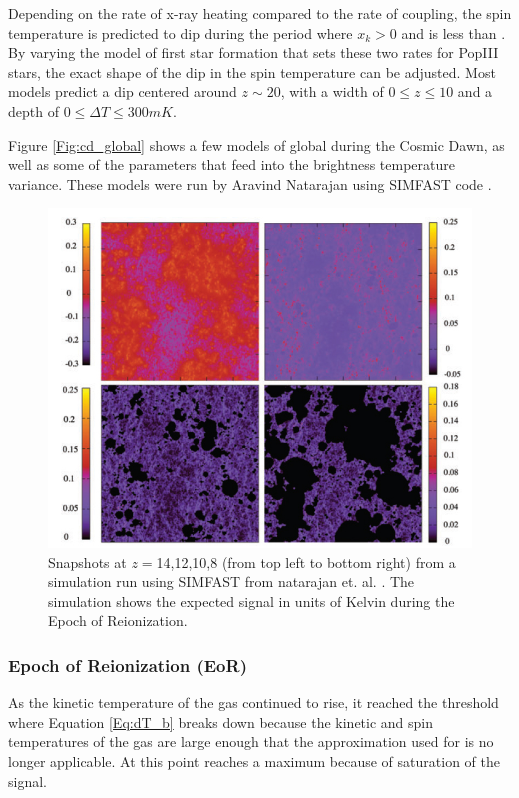 Depending on the rate of x-ray heating compared to the rate of \lya coupling, the spin temperature is predicted to dip during the period where $x_k>0$ and \tk is less than \tg. By varying the model of first star formation that sets these two rates for PopIII stars, the exact shape of the dip in the spin temperature can be adjusted. Most models predict a dip centered around $z\sim20$, with a width of $0 \leq z \leq 10$ and a depth of $0\leq \Delta T \leq 300 mK$. 

Figure \ref{Fig:cd_global} shows a few models of global \dtb during the Cosmic Dawn, as well as some of the parameters that feed into the brightness temperature variance. These models were run by Aravind Natarajan using SIMFAST code \cite{simfast}\cite{21cmfast}\cite{natarajan_2014}.  

\begin{figure}[htb]
\begin{center}
\includegraphics[width=0.95\linewidth]{Introduction/figures/reionization.jpg}
\caption{Snapshots at $z=$14,12,10,8 (from top left to bottom right) from a simulation run using SIMFAST from natarajan et. al. \cite{natarajan_2014}. The simulation shows the expected \dtb signal in units of Kelvin during the Epoch of Reionization. }
\label{Fig:eor}
\end{center}
\end{figure}

\subsubsection{Epoch of Reionization (EoR)}
As the kinetic temperature of the gas continued to rise, it reached the threshold where Equation \ref{Eq:dT_b} breaks down because the kinetic and spin temperatures of the gas are large enough that the approximation used for \tu is no longer applicable. At this point \dtb reaches a maximum because of saturation of the signal. 

